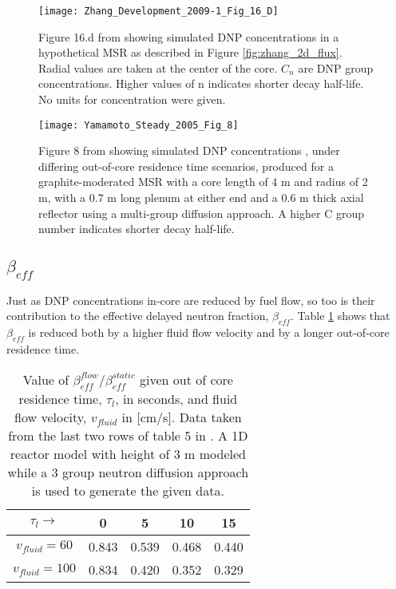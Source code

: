 \documentclass[review]{elsarticle}
\begin{document}
\begin{figure}[H]
   \centering
   \texttt{[image: Zhang\_Development\_2009-1\_Fig\_16\_D]}
   \caption{Figure 16.d from \cite{zhang_development_2009-1} showing simulated DNP concentrations
               in a hypothetical MSR as described in Figure \ref{fig:zhang_2d_flux}.
               Radial
               values are taken at the center of the core. $C_{n}$ are DNP
               group concentrations. Higher values of n indicates shorter decay half-life. No units for concentration were given.}
   \label{fig:zhang_radial_velocity_dnp_2}
\end{figure}

\begin{figure}[H]
   \centering
   \texttt{[image: Yamamoto\_Steady\_2005\_Fig\_8]}
   \caption{Figure 8 from \cite{yamamoto_steady_2005} showing simulated DNP
     concentrations
    , under differing out-of-core residence time scenarios, produced for
    a graphite-moderated MSR with a core length of 4 m and radius of 2 m,
    with a 0.7 m long 
    plenum at either end and a 0.6 m thick axial reflector using a
    multi-group diffusion approach. A higher C group number indicates
    shorter decay half-life.}
   \label{fig:yamamoto_transit_time}
\end{figure}

\subsection{$\beta_{eff}$} \label{ssec:beta}
Just as DNP concentrations in-core are reduced by fuel flow, so too is their
contribution to the effective delayed neutron fraction, $\beta_{eff}$.
Table \ref{tbl:mattioda_beta_reduction} shows 
that $\beta_{eff}$ is reduced both by a higher fluid flow velocity and
by a longer out-of-core residence time.

\begin{table}[h]
    \caption{Value of $\beta_{eff}^{flow}/\beta_{eff}^{static}$ given out of
        core residence time, $\tau_{l}$, in seconds, 
        and fluid flow velocity, $v_{fluid}$ in [cm/s]. Data taken from
        the last two rows of table 5
        in \cite{mattioda_effective_2000}. A 1D reactor model with height of 3 m
        modeled while a 3 group neutron diffusion approach is used to generate
        the given data.} 
    \label{tbl:mattioda_beta_reduction}
    \begin{center}
        \begin{tabular}{|c|c|c|c|c|}
            \hline
            $\tau_{l}\rightarrow$ & 0 & 5 & 10 & 15 \\
            \hline
            $v_{fluid} = 60$ & 0.843 & 0.539 & 0.468 & 0.440 \\
            \hline
            $v_{fluid} = 100$ & 0.834 & 0.420 & 0.352 & 0.329 \\
            \hline
        \end{tabular}
    \end{center}
\end{table}
\end{document}
